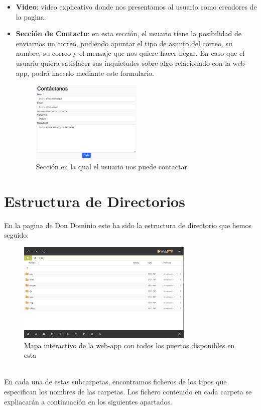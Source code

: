 \documentclass{article}
\begin{document}
\begin{itemize}
    \item \textbf{Video}: video explicativo donde nos presentamos al usuario como creadores de la pagina.
    \item \textbf{Sección de Contacto}: en esta sección, el usuario tiene la posibilidad de enviarnos un correo, pudiendo apuntar el tipo de asunto del correo, su nombre, su correo y el mensaje que nos quiere hacer llegar. En caso que el usuario quiera satisfacer sus inquietudes sobre algo relacionado con la web-app, podrá hacerlo mediante este formulario.
    \begin{figure}[ht]
        \centering
        \includegraphics[width=0.5\textwidth]{images/contacto.png}
        \caption{Sección en la qual el usuario nos puede contactar}
    \end{figure}
\end{itemize}
\newpage
\section{Estructura de Directorios}
En la pagina de Don Dominio este ha sido la estructura de directorio que hemos seguido:
\begin{figure}[ht]
    \centering
    \includegraphics[width=0.75\textwidth]{images/estructuraDirectorios.png}
    \caption{Mapa interactivo de la web-app con todos los puertos disponibles en esta}
\end{figure}\\
En cada una de estas subcarpetas, encontramos ficheros de los tipos que especifican los nombres de las carpetas. Los fichero contenido en cada carpeta se expliacarán a continuación en los siguientes apartados.
\end{document}
